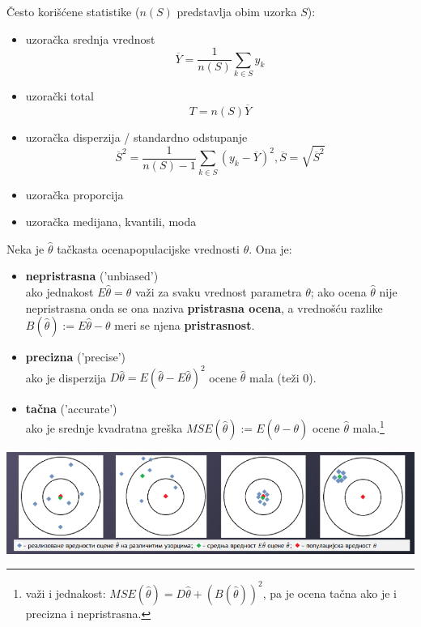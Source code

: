 \documentclass[10pt,a4paper,]{article}
\begin{document}
Često korišćene statistike ($n(S)$ predstavlja obim uzorka $S$):
\begin{itemize}
\item uzoračka srednja vrednost
	$$ \overline{Y} = \frac{1}{n(S)} \sum_{k \in S}y_k$$
\item uzorački total
	$$ T = n(S)\overline{Y}$$
\item uzoračka disperzija / standardno odstupanje 
	$$ \overline{S}^2 = \frac{1}{n(S) - 1}\sum_{k \in S}(y_k - \overline{Y})^2, \overline{S} = \sqrt{\overline{S}^2}$$
\item uzoračka proporcija 
\item uzoračka medijana, kvantili, moda
\end{itemize}
Neka je $\hat{\theta}$ tačkasta ocenapopulacijske vrednosti
$\theta$. Ona je:
\begin{itemize}
\item \textbf{nepristrasna} ('unbiased')
\\
ako jednakost \textbf{$E\hat{\theta} = \theta$} važi za svaku 
vrednost 
parametra $\theta$; ako ocena $\hat{\theta}$ nije nepristrasna onda 
se ona naziva \textbf{pristrasna ocena}, a vrednošću razlike  
$B(\hat{\theta}) := E\hat{\theta} - \theta$ meri se njena 
\textbf{pristrasnost}.
\item \textbf{precizna} ('precise')
\\
ako je disperzija $D\hat{\theta} = E(\hat{\theta} - E\hat{\theta})^2$
ocene $\hat{\theta}$ mala (teži 0).

\item \textbf{tačna} ('accurate')
\\
ako je srednje kvadratna greška 
$MSE(\hat{\theta}) := E(\hat{\theta}-\theta)$ ocene $\hat{\theta}$ 
mala.\footnote{važi i jednakost: 
$MSE(\hat{\theta}) = D\hat{\theta} + (B(\hat{\theta}))^2$, pa je 
ocena tačna ako je i precizna i nepristrasna.}

\end{itemize}
\includegraphics[scale=0.5]{primer7}
\end{document}
